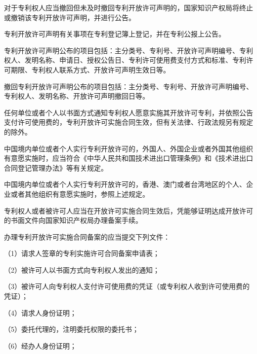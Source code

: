 对于专利权人应当撤回但未及时撤回专利开放许可声明的，国家知识产权局将终止或撤销该专利开放许可声明，并进行公告。

专利开放许可声明有关事项在专利登记簿上登记，并在专利公报上公告。

专利开放许可声明公布的项目包括：主分类号、专利号、开放许可声明编号、专利权人、发明名称、申请日、授权公告日、专利许可使用费支付方式和标准、专利许可期限、专利权人联系方式、开放许可声明生效日等。

撤回专利开放许可声明公布的项目包括：主分类号、专利号、开放许可声明编号、专利权人、发明名称、开放许可声明撤回日等。

任何单位或者个人以书面方式通知专利权人愿意实施其开放许可专利，并依照公告支付许可使用费的，专利开放许可实施合同生效，但有关法律、行政法规另有规定的除外。

中国境内单位或者个人实行专利开放许可的，外国人、外国企业或者外国其他组织有意愿实施时，应当符合《中华人民共和国技术进出口管理条例》和《技术进出口合同登记管理办法》等有关规定。

中国境内单位或者个人实行专利开放许可的，香港、澳门或者台湾地区的个人、企业或者其他组织有意愿实施时，参照上述规定。

专利权人或者被许可人应当在开放许可实施合同生效后，凭能够证明达成开放许可的书面文件向国家知识产权局办理备案手续。

办理专利开放许可实施合同备案的应当提交下列文件：

{\setlength{\parindent}{17.1bp}（1）请求人签章的专利实施许可合同备案申请表；\par}

{\setlength{\parindent}{17.1bp}（2）被许可人以书面方式向专利权人发出的通知；\par}

{\setlength{\parindent}{17.1bp}（3）被许可人向专利权人支付许可使用费的凭证（或专利权人收到许可使用费的凭证）；\par}

{\setlength{\parindent}{17.1bp}（4）请求人身份证明；\par}

{\setlength{\parindent}{17.1bp}（5）委托代理的，注明委托权限的委托书；\par}

{\setlength{\parindent}{17.1bp}（6）经办人身份证明；\par}

